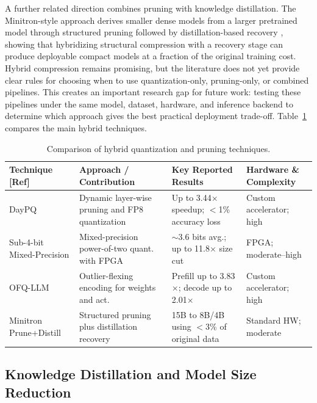A further related direction combines pruning with knowledge distillation. The Minitron-style approach derives smaller dense models from a larger pretrained model through structured pruning followed by distillation-based recovery \cite{muralidharan2024minitron}, showing that hybridizing structural compression with a recovery stage can produce deployable compact models at a fraction of the original training cost. Hybrid compression remains promising, but the literature does not yet provide clear rules for choosing when to use quantization-only, pruning-only, or combined pipelines. This creates an important research gap for future work: testing these pipelines under the same model, dataset, hardware, and inference backend to determine which approach gives the best practical deployment trade-off. Table~\ref{tab:lr-hybrid} compares the main hybrid techniques.

\begin{table}[htbp]
\centering
\scriptsize
\caption{Comparison of hybrid quantization and pruning techniques.}
\label{tab:lr-hybrid}
\renewcommand{\arraystretch}{1.2}
\begin{tabular}{p{}p{}p{}p{}}
\hline
\textbf{Technique [Ref]} & \textbf{Approach / Contribution} & \textbf{Key Reported Results} & \textbf{Hardware \& Complexity} \\
\hline
DayPQ \cite{xu2026daypq} & Dynamic layer-wise pruning and FP8 quantization & Up to 3.44$\times$ speedup; $<$1\% accuracy loss & Custom accelerator; high \\
Sub-4-bit Mixed-Precision \cite{cho2025sub4bit} & Mixed-precision power-of-two quant. with FPGA & $\sim$3.6 bits avg.; up to 11.8$\times$ size cut & FPGA; moderate--high \\
OFQ-LLM \cite{wang2025ofqllm} & Outlier-flexing encoding for weights and act. & Prefill up to 3.83$\times$; decode up to 2.01$\times$ & Custom accelerator; high \\
Minitron Prune+Distill \cite{muralidharan2024minitron} & Structured pruning plus distillation recovery & 15B to 8B/4B using $<$3\% of original data & Standard HW; moderate \\
\hline
\end{tabular}
\end{table}

\subsection{Knowledge Distillation and Model Size Reduction}

